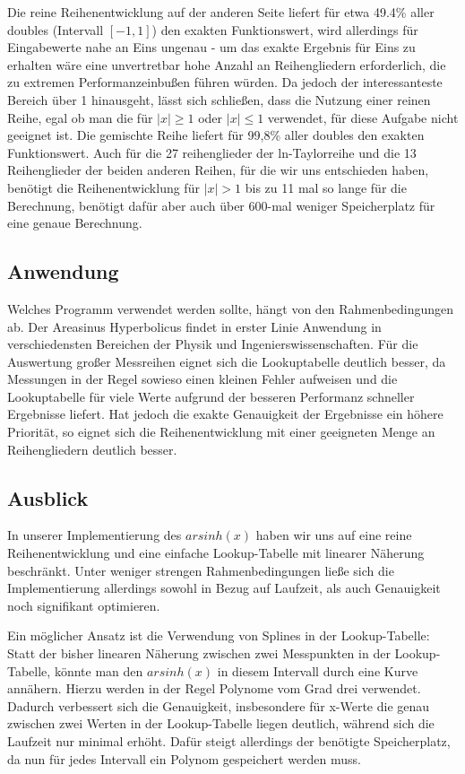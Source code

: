 \documentclass[course=erap] {aspdoc}
\begin{document}
     Die reine Reihenentwicklung auf der anderen Seite liefert für etwa 49.4\% aller doubles (Intervall $[-1, 1]$) den exakten Funktionswert, wird allerdings für Eingabewerte nahe an Eins ungenau - um das exakte Ergebnis für Eins zu erhalten wäre eine unvertretbar hohe Anzahl an Reihengliedern erforderlich, die zu extremen Performanzeinbußen führen würden. Da jedoch der interessanteste Bereich über 1 hinausgeht, lässt sich schließen, dass die Nutzung einer reinen Reihe, egal ob man die für $|x|\geq1$ oder $|x|\leq1$ verwendet, für diese Aufgabe nicht geeignet ist.
     Die gemischte Reihe liefert für 99,8\% aller doubles den exakten Funktionswert.
     Auch für die 27 reihenglieder der ln-Taylorreihe und die 13 Reihenglieder der beiden anderen Reihen, für die wir uns entschieden haben, benötigt die Reihenentwicklung für $|x|>1$ bis zu 11 mal so lange für die Berechnung, benötigt dafür aber auch über 600-mal weniger Speicherplatz für eine genaue Berechnung.
 
 
     
     \subsection{Anwendung}
     Welches Programm verwendet werden sollte, hängt von den Rahmenbedingungen ab.
     Der Areasinus Hyperbolicus findet in erster Linie Anwendung in verschiedensten Bereichen der Physik und Ingenierswissenschaften.
     Für die Auswertung großer Messreihen eignet sich die Lookuptabelle deutlich besser, da Messungen in der Regel sowieso einen kleinen Fehler aufweisen und die Lookuptabelle für viele Werte aufgrund der besseren Performanz schneller Ergebnisse liefert.
     Hat jedoch die exakte Genauigkeit der Ergebnisse ein höhere Priorität, so eignet sich die Reihenentwicklung mit einer geeigneten Menge an Reihengliedern deutlich besser.
 
     \subsection{Ausblick}
 
     In unserer Implementierung des $arsinh(x)$ haben wir uns auf eine reine Reihenentwicklung und eine einfache Lookup-Tabelle mit linearer Näherung beschränkt.
     Unter weniger strengen Rahmenbedingungen ließe sich die Implementierung allerdings sowohl in Bezug auf Laufzeit, als auch Genauigkeit noch signifikant optimieren. 
     
     Ein möglicher Ansatz ist die Verwendung von Splines in der Lookup-Tabelle: Statt der bisher linearen Näherung zwischen zwei Messpunkten in der Lookup-Tabelle, könnte man den $arsinh(x)$ in diesem Intervall durch eine Kurve annähern.
     Hierzu werden in der Regel Polynome vom Grad drei verwendet.
     Dadurch verbessert sich die Genauigkeit, insbesondere für x-Werte die genau zwischen zwei Werten in der Lookup-Tabelle liegen deutlich, während sich die Laufzeit nur minimal erhöht.
     Dafür steigt allerdings der benötigte Speicherplatz, da nun für jedes Intervall ein Polynom gespeichert werden muss.
     
\end{document}

